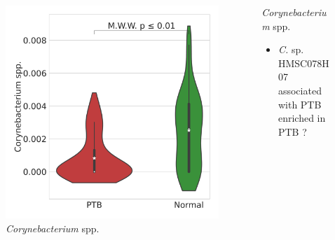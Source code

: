 \documentclass{beamer}
\begin{document}
\begin{frame}[allowframebreaks]
        \begin{columns}
            \begin{column}{0.4 \linewidth}
                \begin{figure}
                    \includegraphics[width=\linewidth]{figures/RandomForest_Proportion/singleton-RF.DADA2.homd.Mouth/Violin_2.pdf}
                    \caption{\textit{Corynebacterium} spp.}
                \end{figure}
            \end{column}
            \begin{column}{0.6 \linewidth}
                \begin{block}{\textit{Corynebacterium} spp.}
                    \begin{itemize}
                        \item \textit{C.} sp. HMSC078H07 associated with PTB \cite{Corynebacterium-3} \\
                            enriched in PTB ?
                    \end{itemize}
                \end{block}
            \end{column}
        \end{columns}


\end{frame}
\end{document}
